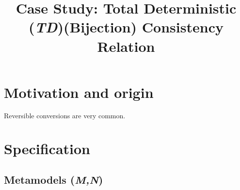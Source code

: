 \documentclass{article}
\begin{document}
\title{Case Study: Total Deterministic (\textit{TD})(Bijection) Consistency Relation}

\maketitle


\section{Motivation and origin}

Reversible conversions are very common.

\section{Specification}
\label{sec:spec}

\subsection{Metamodels (\textit{M,N})}
\label{sec:metamodels}
\end{document}
